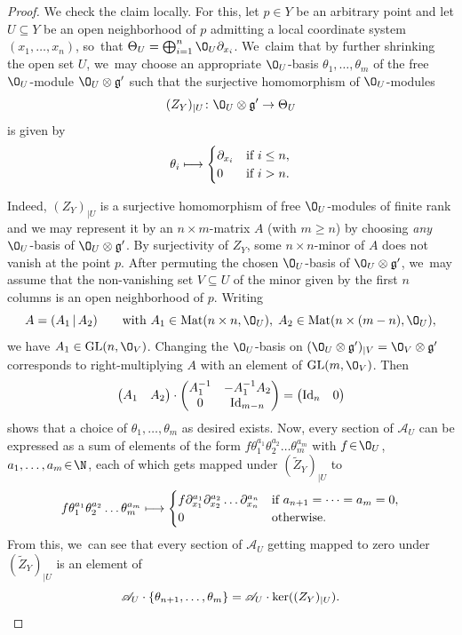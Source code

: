 \documentclass[JEP,XML,SOM,Unicode,published]{cedram}
\newcommand\mto{\mathchoice{\longmapsto}{\mapsto}{\mapsto}{\mapsto}}
\newcommand{\cA}{\mathscr{A}}
\newcommand{\frg}{\mathfrak{g}}
\DeclareMathOperator{\GL}{\textup{GL}}
\DeclareMathOperator{\Id}{Id}
\newcommand\restr[2]{{#1_{| {#2}}}}
\newcommand\restrK[2]{{(#1)_{| {#2}}}}
\begin{document}
\begin{proof}
We check the claim locally. For this, let $p \in Y$ be an arbitrary point and let $U \subseteq Y$ be an open neighborhood of $p$ admitting a local coordinate system $(x_1,\dots,x_n)$, so~that $\Theta_U = \bigoplus_{i=1}^n \O_U \partial_{x_i}$. We~claim that by further shrinking the open set $U$, we~may choose
an appropriate $\O_U$-basis $\theta_1,\dots,\theta_m$ of the free $\O_U$\nobreakdash-mod\-ule $\O_U \otimes \frg'$ such that the surjective homomorphism of $\O_U$\nobreakdash-mod\-ules
\[
\restrK{Z_Y}{U} \colon \O_U \otimes \frg' \to \Theta_U
\]
is given by
\[
\theta_i \mto 
\begin{cases} \partial_{x_i} &\text{if } i \leq n, \\ 0 &\text{if } i > n. \end{cases}
\]

Indeed, $\restrK{Z_Y}{U}$ is a surjective homomorphism of free $\O_U$\nobreakdash-mod\-ules of finite rank and we may represent it by an $n \times m$-matrix $A$ (with $m \geq n$) by choosing \emph{any} $\O_U$\nobreakdash-basis of $\O_U \otimes \frg'$. By surjectivity of $Z_Y$, some $n \times n$-minor of $A$ does not vanish at the point $p$. After permuting the chosen $\O_U$-basis of $\O_U \otimes \frg'$, we~may assume that the non-vanishing set $V \subseteq U$ of the minor given by the first $n$ columns is an open neighborhood of $p$. Writing\vspace*{-3pt}
\[
A = (A_1 \, | \, A_2) \qquad \text{with } A_1 \in \operatorname{Mat}(n\times n,\O_U),\; A_2 \in \operatorname{Mat}(n\times (m-n),\O_U),
\]
we have $A_1 \in \GL(n,\O_V)$. Changing the $\O_U$-basis on $\restr{(\O_U \otimes \frg')}{V} = \O_V \otimes \frg'$ corresponds to right-multiplying $A$ with an element of $\GL(m,\O_V)$. Then
\[
\begin{pmatrix}
A_1 & A_2
\end{pmatrix} \cdot
\begin{pmatrix}
\arraycolsep3.5pt
A_1^{-1} & -A_1^{-1}A_2 \\
0 & \Id_{m-n}
\end{pmatrix} =
\begin{pmatrix}
\Id_n & 0
\end{pmatrix}
\]
shows that a choice of $\theta_1,\dots, \theta_m$ as desired exists.
Now, every section of $\cA_U$ can be expressed as a sum of elements of the form $f \theta_1^{a_1} \theta_2^{a_2} \dots \theta_m^{a_m}$ with $f \!\in\! \O_U$, \hbox{$a_1,\dots,a_m \!\in\! \N$}, each of which gets mapped under $\restrK{\tilde{Z}_Y}{U}$ to\vspace*{-3pt}
\[
f \theta_1^{a_1} \theta_2^{a_2} \dots \theta_m^{a_m} \mto 
\begin{cases}
f \partial_{x_1}^{a_1} \partial_{x_2}^{a_2} \dots \partial_{x_n}^{a_n} &\text{if } a_{n+1} = \dots = a_m = 0, \\
0 &\text{otherwise.}
\end{cases}
\]
From this, we~can see that every section of $\cA_U$ getting mapped to zero under $\restrK{\tilde{Z}_Y}{U}$ is an element of\vspace*{-3pt}
\[
\cA_U \cdot \{\theta_{n+1},\dots,\theta_m\} = \cA_U \cdot \ker(\restrK{Z_Y}{U}). \qedhere
\]
\end{proof}
\end{document}
